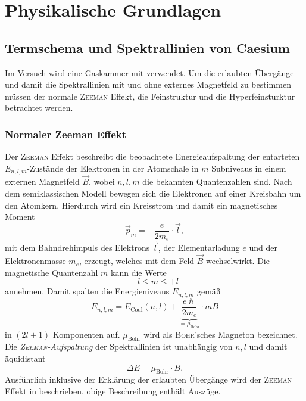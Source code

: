 \documentclass[../bericht.tex]{subfiles}
\begin{document}
  \chapter{Physikalische Grundlagen}


    \section{Termschema und Spektrallinien von Caesium}


      Im Versuch wird eine Gaskammer mit  verwendet. Um die erlaubten Übergänge und damit die Spektrallinien mit und ohne externes  Magnetfeld zu bestimmen müssen der normale \textsc{Zeeman} Effekt, die Feinstruktur und die Hyperfeinsturktur betrachtet werden.


      \subsection{Normaler Zeeman Effekt}
      \label{subsec:zeeman}

        Der \textsc{Zeeman} Effekt beschreibt die beobachtete Energieaufspaltung der entarteten $E_{n,l,m}$-Zustände der Elektronen in der Atomschale in $m$ Subniveaus in einem externen Magnetfeld $\vec{B}$, wobei $n,l,m$ die bekannten Quantenzahlen sind. Nach dem semiklassischen Modell bewegen sich die Elektronen auf einer Kreisbahn um den Atomkern. Hierdurch wird ein Kreisstrom und damit ein magnetisches Moment
        \begin{equation*}
          \vec{p}_m=-\frac{e}{2m_e}\cdot \vec{l},
        \end{equation*}
        mit dem Bahndrehimpuls des Elektrons $\vec{l}$, der Elementarladung $e$ und der Elektronenmasse $m_e$, erzeugt, welches mit dem Feld $\vec{B}$ wechselwirkt. Die magnetische Quantenzahl $m$ kann die Werte
        \begin{equation*}
          -l \le m \le +l
        \end{equation*}
        annehmen. Damit spalten die Energieniveaus $E_{n,l,m}$ gemä\ss
        \begin{equation}
          E_{n,l,m}=E_\mathrm{Coul}(n,l)+\underbrace{\frac{e\hslash}{2m_e}}_{=\mu_\mathrm{Bohr}}\cdot mB
        \end{equation}
        in $(2l+1)$ Komponenten auf. $\mu_\mathrm{Bohr}$ wird als \textsc{Bohr}'sches Magneton bezeichnet. Die \textit{\textsc{Zeeman}-Aufspaltung} der Spektrallinien ist unabhängig von $n,l$ und damit äquidistant
        \begin{equation}
          \Delta E=\mu_\mathrm{Bohr}\cdot B.
        \end{equation}
        Ausführlich inklusive der Erklärung der erlaubten Übergänge wird der \textsc{Zeeman} Effekt in \cite{dem:exp3-normaler-zeeman} beschrieben, obige Beschreibung enthält Auszüge.
\end{document}
